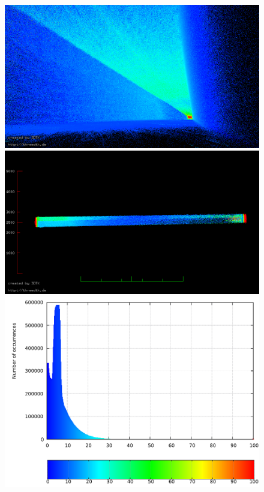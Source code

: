 \begin{figure}
\begin{minipage}[c]{0.49\textwidth}
  	\end{minipage}\hfill
  	\begin{minipage}[c]{0.49\textwidth}
  		\centering
		\includegraphics[width=\textwidth]{./images/corr_bottom_pose}\\
		\includegraphics[width=\textwidth]{./images/corr_side_view}\\
  		\includegraphics[width=\textwidth]{./images/corr_hist}

\end{minipage}
\end{figure}
